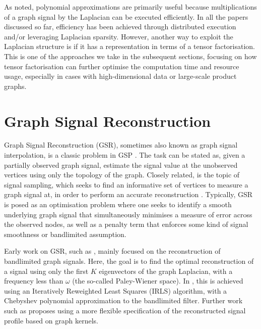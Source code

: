 As noted, polynomial approximations are primarily useful because multiplications of a graph signal by the Laplacian can be executed efficiently. In all the papers discussed so far, efficiency has been achieved through distributed execution and/or leveraging Laplacian sparsity. However, another way to exploit the Laplacian structure is if it has a representation in terms of a tensor factorisation. This is one of the approaches we take in the subsequent sections, focusing on how tensor factorisation can further optimise the computation time and resource usage, especially in cases with high-dimensional data or large-scale product graphs.


\section{Graph Signal Reconstruction}

Graph Signal Reconstruction (GSR), sometimes also known as graph signal interpolation, is a classic problem in GSP \citep{Ortega2018}. The task can be stated as, given a partially observed graph signal, estimate the signal value at the unobserved vertices using only the topology of the graph. Closely related, is the topic of signal sampling, which seeks to find an informative set of vertices to measure a graph signal at, in order to perform an accurate reconstruction \citep{Tanaka2020}. Typically, GSR is posed as an optimisation problem where one seeks to identify a smooth underlying graph signal that simultaneously minimises a measure of error across the observed nodes, as well as a penalty term that enforces some kind of signal smoothness or bandlimited assumption. 

Early work on GSR, such as \cite{Narang2013b,Narang2013,Wang2015b,Anis2016}, mainly focused on the reconstruction of bandlimited graph signals. Here, the goal is to find the optimal reconstruction of a signal using only the first $K$ eigenvectors of the graph Laplacian, with a frequency less than $\omega$ (the so-called Paley-Wiener space). In \cite{Narang2013b}, this is achieved using an Iteratively Reweighted Least Squares (IRLS) algorithm, with a Chebyshev polynomial approximation to the bandlimited filter. Further work such as \citep{Romero2017b} proposes using a more flexible specification of the reconstructed signal profile based on graph kernels. 

